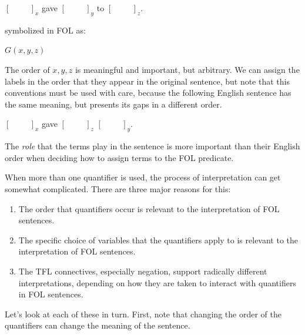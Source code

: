 \begin{argument}
\item[ ] $[\hspace{1cm}]_x$ gave $[\hspace{1cm}]_y$ to $[\hspace{1cm}]_z$.
\end{argument}

symbolized in FOL as:

\begin{argument}
\item[ ] $G(x,y,z)$
\end{argument}

The order of $x,y,z$ is meaningful and important, but arbitrary. We can assign
the labels in the order that they appear in the original sentence, but note
that this conventions must be used with care, because the following English
sentence has the same meaning, but presents its gaps in a different order.

\begin{argument}
\item[ ] $[\hspace{1cm}]_x$ gave $[\hspace{1cm}]_z$ $[\hspace{1cm}]_y$.
\end{argument}

The \emph{role} that the terms play in the sentence is more important than their
English order when deciding how to assign terms to the FOL predicate.

When more than one quantifier is used, the process of interpretation can get
somewhat complicated. There are three major reasons for this:

\begin{enumerate}
\item The order that quantifiers occur is relevant to the interpretation of
  FOL sentences.
\item The specific choice of variables that the quantifiers apply to is relevant
  to the interpretation of FOL sentences.
\item The TFL connectives, especially negation, support radically different
  interpretations, depending on how they are taken to interact with quantifiers
  in FOL sentences.
\end{enumerate}

Let's look at each of these in turn. First, note that changing the order of the
quantifiers can change the meaning of the sentence.

